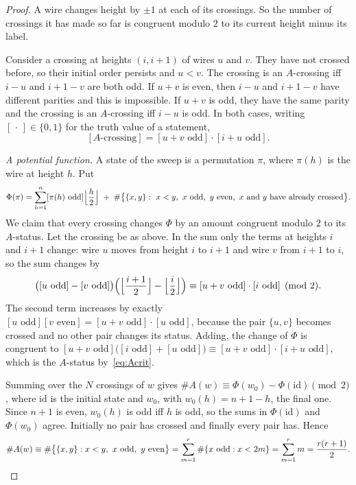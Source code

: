 \begin{proof}
A wire changes height by $\pm1$ at each of its crossings. So the number of crossings it has made so
far is congruent modulo $2$ to its current height minus its label.

Consider a crossing at heights $(i,i+1)$ of wires $u$ and $v$. They have not crossed before, so their
initial order persists and $u<v$. The crossing is an $A$-crossing iff $i-u$ and $i+1-v$ are both odd.
If $u+v$ is even, then $i-u$ and $i+1-v$ have different parities and this is impossible. If $u+v$ is
odd, they have the same parity and the crossing is an $A$-crossing iff $i-u$ is odd. In both cases,
writing $[\,\cdot\,]\in\{0,1\}$ for the truth value of a statement,
\begin{equation}\label{eq:Acrit}
  [\text{$A$-crossing}]=[u+v\text{ odd}]\cdot[i+u\text{ odd}] .
\end{equation}

\emph{A potential function.} A state of the sweep is a permutation $\pi$, where $\pi(h)$ is the wire
at height $h$. Put
\[
  \Phi(\pi)=\sum_{h=1}^{n}[\pi(h)\text{ odd}]\Bigl\lfloor\frac h2\Bigr\rfloor
  \;+\;\#\bigl\{\{x,y\}:\ x<y,\ x\text{ odd},\ y\text{ even},\ \text{$x$ and $y$ have already crossed}\bigr\}.
\]
We claim that every crossing changes $\Phi$ by an amount congruent modulo $2$ to its $A$-status. Let
the crossing be as above. In the sum only the terms at heights $i$ and $i+1$ change: wire $u$ moves
from height $i$ to $i+1$ and wire $v$ from $i+1$ to $i$, so the sum changes by
\[
  \bigl([u\text{ odd}]-[v\text{ odd}]\bigr)
  \Bigl(\Bigl\lfloor\frac{i+1}2\Bigr\rfloor-\Bigl\lfloor\frac i2\Bigr\rfloor\Bigr)
  \equiv[u+v\text{ odd}]\cdot[i\text{ odd}]\pmod 2 .
\]
The second term increases by exactly $[u\text{ odd}][v\text{ even}]=[u+v\text{ odd}]\cdot[u\text{ odd}]$,
because the pair $\{u,v\}$ becomes crossed and no other pair changes its status. Adding, the change
of $\Phi$ is congruent to $[u+v\text{ odd}]\bigl([i\text{ odd}]+[u\text{ odd}]\bigr)\equiv
[u+v\text{ odd}]\cdot[i+u\text{ odd}]$, which is the $A$-status by~\eqref{eq:Acrit}.

Summing over the $N$ crossings of $w$ gives $\#A(w)\equiv\Phi(w_0)-\Phi(\mathrm{id})\pmod 2$, where
$\mathrm{id}$ is the initial state and $w_0$, with $w_0(h)=n+1-h$, the final one. Since $n+1$ is even,
$w_0(h)$ is odd iff $h$ is odd, so the sums in $\Phi(\mathrm{id})$ and $\Phi(w_0)$ agree. Initially no
pair has crossed and finally every pair has. Hence
\[
  \#A(w)\equiv\#\bigl\{\{x,y\}:x<y,\ x\text{ odd},\ y\text{ even}\bigr\}
  =\sum_{m=1}^{r}\#\{x\text{ odd}:x<2m\}=\sum_{m=1}^{r}m=\frac{r(r+1)}2 .\qedhere
\]
\end{proof}


